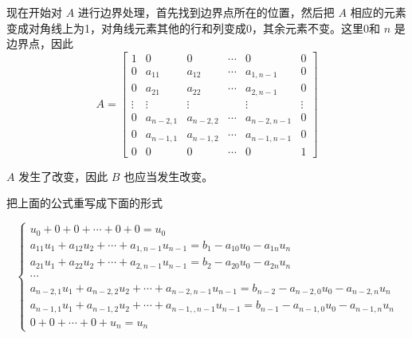 \documentclass[12pt,a4paper]{article}
\begin{document}
现在开始对 $A$ 进行边界处理，首先找到边界点所在的位置，然后把 $A$ 相应的元素变成对角线上为1，对角线元素其他的行和列变成0，其余元素不变。这里0和 $n$ 是边界点，因此
$$
A=\begin{bmatrix}
1 & 0 & 0 & \cdots & 0 & 0 \\
0 & a_{11} & a_{12} & \cdots & a_{1,n-1} & 0 \\
0 & a_{21} & a_{22} & \cdots & a_{2,n-1} & 0 \\
\vdots & \vdots & \vdots &  & \vdots  & \vdots \\
0 & a_{n-2,1} & a_{n-2,2} & \cdots & a_{n-2,n-1} & 0 \\
0 & a_{n-1,1} & a_{n-1,2} & \cdots & a_{n-1,n-1} & 0 \\
0 & 0 & 0 & \cdots & 0 & 1 
\end{bmatrix}
$$

$A$ 发生了改变，因此 $B$ 也应当发生改变。

把上面的公式重写成下面的形式

$$
\begin{cases}
u_0 + 0 + 0 +\cdots + 0 + 0=u_0 \\
a_{11}u_1 + a_{12}u_2 +\cdots + a_{1,n-1}u_{n-1}=b_1-a_{10}u_0-a_{1n}u_n \\
 a_{21}u_1 + a_{22}u_2 +\cdots + a_{2,n-1}u_{n-1}=b_2-a_{20}u_0-a_{2n}u_n\\
\cdots \\
a_{n-2,1}u_1 + a_{n-2,2}u_2 +\cdots + a_{n-2,n-1}u_{n-1}=b_{n-2}-a_{n-2,0}u_0-a_{n-2,n}u_n \\
a_{n-1,1}u_1 + a_{n-1,2}u_2 +\cdots + a_{n-1,,n-1}u_{n-1}=b_{n-1}-a_{n-1,0}u_0-a_{n-1,n}u_n \\
0 + 0 +\cdots + 0 + u_n=u_n
\end{cases}
$$
\end{document}
